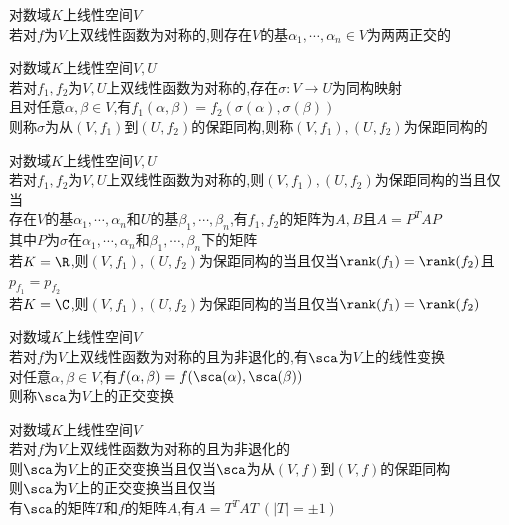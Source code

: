 \begin{dingli}
对数域$K$上线性空间$V$\\
若对$f$为$V$上双线性函数为对称的,则存在$V$的基$\alpha_1,\cdots,\alpha_n\in V$为两两正交的
\end{dingli}

\begin{dingli}
对数域$K$上线性空间$V,U$\\
若对$f_1,f_2$为$V,U$上双线性函数为对称的,存在$\sigma:V\to U$为同构映射\\
且对任意$\alpha,\beta\in V$,有$f_1(\alpha,\beta)=f_2(\sigma(\alpha),\sigma(\beta))$\\
则称$\sigma$为从$(V,f_1)$到$(U,f_2)$的保距同构,则称$(V,f_1),(U,f_2)$为保距同构的
\end{dingli}

\begin{dingli}
对数域$K$上线性空间$V,U$\\
若对$f_1,f_2$为$V,U$上双线性函数为对称的,则$(V,f_1),(U,f_2)$为保距同构的当且仅当\\
存在$V$的基$\alpha_1,\cdots,\alpha_n$和$U$的基$\beta_1,\cdots,\beta_n$,有$f_1,f_2$的矩阵为$A,B$且$A=P^{T}AP$\\
其中$P$为$\sigma$在$\alpha_1,\cdots,\alpha_n$和$\beta_1,\cdots,\beta_n$下的矩阵\\
若$K=\R$,则$(V,f_1),(U,f_2)$为保距同构的当且仅当$\rank(f_1)=\rank(f_2)$且$p_{f_1}=p_{f_2}$\\
若$K=\C$,则$(V,f_1),(U,f_2)$为保距同构的当且仅当$\rank(f_1)=\rank(f_2)$
\end{dingli}

\begin{dingyi}
对数域$K$上线性空间$V$\\
若对$f$为$V$上双线性函数为对称的且为非退化的,有$\sca$为$V$上的线性变换\\
对任意$\alpha,\beta\in V$,有$f(\alpha,\beta)=f(\sca(\alpha),\sca(\beta))$\\
则称$\sca$为$V$上的正交变换
\end{dingyi}

\begin{dingli}
对数域$K$上线性空间$V$\\
若对$f$为$V$上双线性函数为对称的且为非退化的\\
则$\sca$为$V$上的正交变换当且仅当$\sca$为从$(V,f)$到$(V,f)$的保距同构\\
则$\sca$为$V$上的正交变换当且仅当\\
有$\sca$的矩阵$T$和$f$的矩阵$A$,有$A=T^{T}AT\ (|T|=\pm1)$
\end{dingli}

